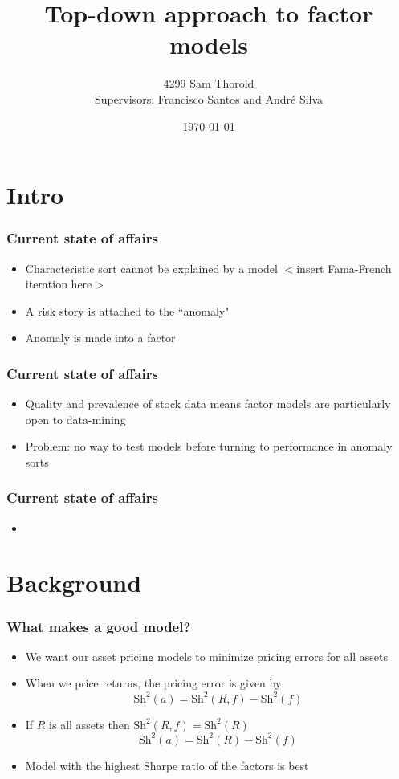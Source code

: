 \documentclass{beamer}
\title[Asset-Pricing]{Top-down approach to factor models}
\author[Thorold]{4299 Sam Thorold\\
                 Supervisors: Francisco Santos and Andr\'e Silva}
\institute{NHH and NOVA}
\date[April 2018]{\today}
\begin{document}
\frame{\titlepage}



\section{Intro}

\begin{frame}
  \frametitle{Current state of affairs}
  \begin{itemize}
    \item Characteristic sort cannot be explained by a model
    \small{$<$insert Fama-French iteration here$>$}
    \item A risk story is attached to the ``anomaly"
    \item Anomaly is made into a factor
  \end{itemize}
\end{frame}

\begin{frame}
  \frametitle{Current state of affairs}
  \begin{itemize}
    \item Quality and prevalence of stock data means factor models are
    particularly open to data-mining
    \item Problem: no way to test models before turning to performance in
    anomaly sorts
  \end{itemize}
\end{frame}

\begin{frame}
  \frametitle{Current state of affairs}
  \begin{itemize}
    \item \cite{harvey2016and}
  \end{itemize}
\end{frame}

\section{Background}

\begin{frame}
\frametitle{What makes a good model?}
\begin{itemize}
    \item<1-> We want our asset pricing models to minimize pricing errors for
    all assets
    \item<1-> When we price returns, the pricing error is given by
    \[
    \text{Sh}^2(a) = \text{Sh}^2(R, f) - \text{Sh}^2(f)
    \]
    \item<2-> If $R$ is all assets then $\text{Sh}^2(R, f) = \text{Sh}^2(R)$
    \[
    \text{Sh}^2(a) = \text{Sh}^2(R) - \text{Sh}^2(f)
    \]
    \item<2->Model with the highest Sharpe ratio of the factors is best
\end{itemize}
\end{frame}
\end{document}
